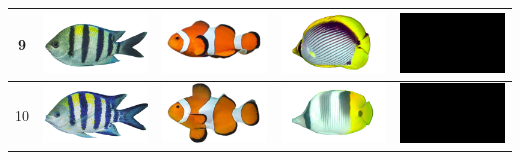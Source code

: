 \begin{longtable}{|c|c|c|c|c|}
    9 & \includegraphics[width=3cm]{gambar/abudefduf/A9} & \includegraphics[width=3cm]{gambar/amphiprion/A9} & \includegraphics[width=3cm]{gambar/chaetodon/C9} & \includegraphics[width=3cm]{gambar/negative_examples/N9} \\
    \hline
    10 & \includegraphics[width=3cm]{gambar/abudefduf/A10} & \includegraphics[width=3cm]{gambar/amphiprion/A10} & \includegraphics[width=3cm]{gambar/chaetodon/C10} & \includegraphics[width=3cm]{gambar/negative_examples/N10} \\
    \hline

\end{longtable}
